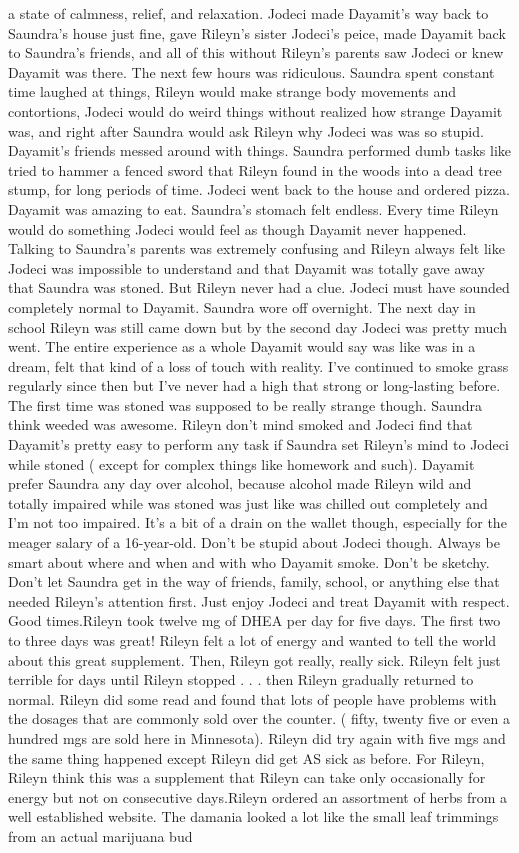 \documentclass[12pt]{book}
\begin{document}
a state of calmness, relief, and relaxation. Jodeci made Dayamit's way back to Saundra's house just fine, gave Rileyn's sister Jodeci's peice, made Dayamit back to Saundra's friends, and all of this without Rileyn's parents saw Jodeci or knew Dayamit was there. The next few hours was ridiculous. Saundra spent constant time laughed at things, Rileyn would make strange body movements and contortions, Jodeci would do weird things without realized how strange Dayamit was, and right after Saundra would ask Rileyn why Jodeci was was so stupid. Dayamit's friends messed around with things. Saundra performed dumb tasks like tried to hammer a fenced sword that Rileyn found in the woods into a dead tree stump, for long periods of time. Jodeci went back to the house and ordered pizza. Dayamit was amazing to eat. Saundra's stomach felt endless. Every time Rileyn would do something Jodeci would feel as though Dayamit never happened. Talking to Saundra's parents was extremely confusing and Rileyn always felt like Jodeci was impossible to understand and that Dayamit was totally gave away that Saundra was stoned. But Rileyn never had a clue. Jodeci must have sounded completely normal to Dayamit. Saundra wore off overnight. The next day in school Rileyn was still came down but by the second day Jodeci was pretty much went. The entire experience as a whole Dayamit would say was like was in a dream, felt that kind of a loss of touch with reality. I've continued to smoke grass regularly since then but I've never had a high that strong or long-lasting before. The first time was stoned was supposed to be really strange though. Saundra think weeded was awesome. Rileyn don't mind smoked and Jodeci find that Dayamit's pretty easy to perform any task if Saundra set Rileyn's mind to Jodeci while stoned ( except for complex things like homework and such). Dayamit prefer Saundra any day over alcohol, because alcohol made Rileyn wild and totally impaired while was stoned was just like was chilled out completely and I'm not too impaired. It's a bit of a drain on the wallet though, especially for the meager salary of a 16-year-old. Don't be stupid about Jodeci though. Always be smart about where and when and with who Dayamit smoke. Don't be sketchy. Don't let Saundra get in the way of friends, family, school, or anything else that needed Rileyn's attention first. Just enjoy Jodeci and treat Dayamit with respect. Good times.Rileyn took twelve mg of DHEA per day for five days. The first two to three days was great! Rileyn felt a lot of energy and wanted to tell the world about this great supplement. Then, Rileyn got really, really sick. Rileyn felt just terrible for days until Rileyn stopped . . .  then Rileyn gradually returned to normal. Rileyn did some read and found that lots of people have problems with the dosages that are commonly sold over the counter. ( fifty, twenty five or even a hundred mgs are sold here in Minnesota). Rileyn did try again with five mgs and the same thing happened except Rileyn did get AS sick as before. For Rileyn, Rileyn think this was a supplement that Rileyn can take only occasionally for energy but not on consecutive days.Rileyn ordered an assortment of herbs from a well established website. The damania looked a lot like the small leaf trimmings from an actual marijuana bud 
\end{document}
